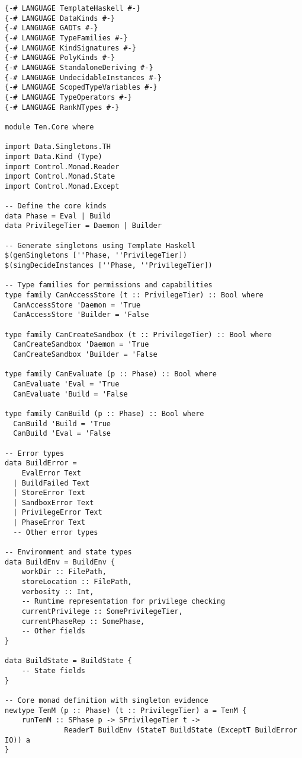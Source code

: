 \documentclass{article}
\begin{document}
\begin{tcolorbox}[title=Ten/Core.hs Changes]
\begin{verbatim}
{-# LANGUAGE TemplateHaskell #-}
{-# LANGUAGE DataKinds #-}
{-# LANGUAGE GADTs #-}
{-# LANGUAGE TypeFamilies #-}
{-# LANGUAGE KindSignatures #-}
{-# LANGUAGE PolyKinds #-}
{-# LANGUAGE StandaloneDeriving #-}
{-# LANGUAGE UndecidableInstances #-}
{-# LANGUAGE ScopedTypeVariables #-}
{-# LANGUAGE TypeOperators #-}
{-# LANGUAGE RankNTypes #-}

module Ten.Core where

import Data.Singletons.TH
import Data.Kind (Type)
import Control.Monad.Reader
import Control.Monad.State
import Control.Monad.Except

-- Define the core kinds
data Phase = Eval | Build
data PrivilegeTier = Daemon | Builder

-- Generate singletons using Template Haskell
$(genSingletons [''Phase, ''PrivilegeTier])
$(singDecideInstances [''Phase, ''PrivilegeTier])

-- Type families for permissions and capabilities
type family CanAccessStore (t :: PrivilegeTier) :: Bool where
  CanAccessStore 'Daemon = 'True
  CanAccessStore 'Builder = 'False

type family CanCreateSandbox (t :: PrivilegeTier) :: Bool where
  CanCreateSandbox 'Daemon = 'True
  CanCreateSandbox 'Builder = 'False

type family CanEvaluate (p :: Phase) :: Bool where
  CanEvaluate 'Eval = 'True
  CanEvaluate 'Build = 'False

type family CanBuild (p :: Phase) :: Bool where
  CanBuild 'Build = 'True
  CanBuild 'Eval = 'False

-- Error types
data BuildError =
    EvalError Text
  | BuildFailed Text
  | StoreError Text
  | SandboxError Text
  | PrivilegeError Text
  | PhaseError Text
  -- Other error types

-- Environment and state types
data BuildEnv = BuildEnv {
    workDir :: FilePath,
    storeLocation :: FilePath,
    verbosity :: Int,
    -- Runtime representation for privilege checking
    currentPrivilege :: SomePrivilegeTier,
    currentPhaseRep :: SomePhase,
    -- Other fields
}

data BuildState = BuildState {
    -- State fields
}

-- Core monad definition with singleton evidence
newtype TenM (p :: Phase) (t :: PrivilegeTier) a = TenM {
    runTenM :: SPhase p -> SPrivilegeTier t ->
              ReaderT BuildEnv (StateT BuildState (ExceptT BuildError IO)) a
}


\end{verbatim}
\end{tcolorbox}
\end{document}
